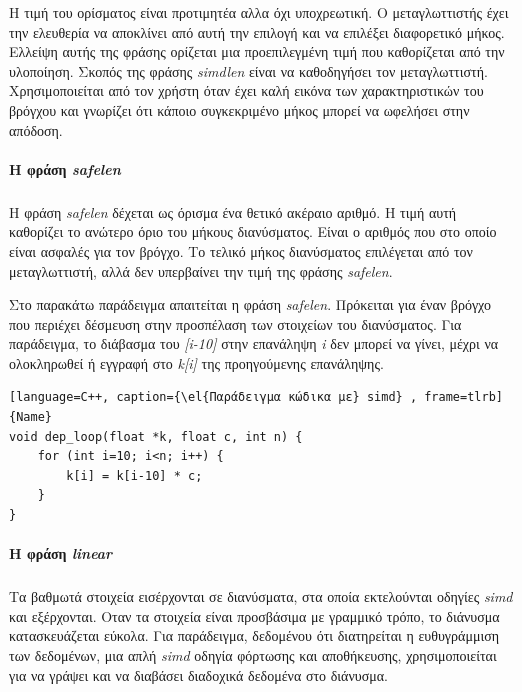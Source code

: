 \documentclass[12pt]{article}
\newcommand{\en}[1]{\foreignlanguage{english}{#1}}
\newcommand{\el}[1]{\selectlanguage{greek}{#1}\selectlanguage{english}}
\begin{document}
Η τιμή του ορίσματος είναι προτιμητέα αλλα όχι υποχρεωτική. Ο μεταγλωττιστής έχει την ελευθερία να αποκλίνει από αυτή την επιλογή και να επιλέξει διαφορετικό μήκος. Ελλείψη αυτής της φράσης ορίζεται μια προεπιλεγμένη τιμή που καθορίζεται από την υλοποίηση. Σκοπός της φράσης \emph{\en{simdlen}} είναι να καθοδηγήσει τον μεταγλωττιστή. Χρησιμοποιείται από τον χρήστη όταν έχει καλή εικόνα των χαρακτηριστικών του βρόγχου και γνωρίζει ότι κάποιο συγκεκριμένο μήκος μπορεί να ωφελήσει στην απόδοση.
\ \\

\paragraph{H φράση \emph{\en{safelen}}}
\subparagraph{}
Η φράση \emph{\en{safelen}} δέχεται ως όρισμα ένα θετικό ακέραιο αριθμό. Η τιμή αυτή καθορίζει το ανώτερο όριο του μήκους διανύσματος. Είναι ο αριθμός που στο οποίο είναι ασφαλές για τον βρόγχο. Το τελικό μήκος διανύσματος επιλέγεται από τον μεταγλωττιστή, αλλά δεν υπερβαίνει την τιμή της φράσης 
\emph{\en{safelen}}.

Στο παρακάτω παράδειγμα απαιτείται η φράση \emph{\en{safelen}}. Πρόκειται για έναν βρόγχο που περιέχει
 δέσμευση στην προσπέλαση των στοιχείων του διανύσματος.
 Για παράδειγμα, το διάβασμα του \emph{\en{[i-10]}} στην επανάληψη \emph{\en{i}} δεν μπορεί να γίνει, μέχρι να ολοκληρωθεί ή εγγραφή στο \emph{\en{k[i]}} της προηγούμενης επανάληψης.
 
 \clearpage

\begin{lstlisting}[language=C++, caption={\el{Παράδειγμα κώδικα με} simd} , frame=tlrb]{Name}
void dep_loop(float *k, float c, int n) {
	for (int i=10; i<n; i++) {
		k[i] = k[i-10] * c;
	}
}
\end{lstlisting}

\paragraph{H φράση \emph{\en{linear}}}
\subparagraph{}
Τα βαθμωτά στοιχεία εισέρχονται σε διανύσματα, στα οποία εκτελούνται οδηγίες \emph{\en{simd}} και εξέρχονται. Οταν τα στοιχεία είναι προσβάσιμα με γραμμικό τρόπο, το διάνυσμα κατασκευάζεται εύκολα. Για παράδειγμα, δεδομένου ότι διατηρείται η ευθυγράμμιση των δεδομένων, μια απλή \emph{\en{simd}} οδηγία φόρτωσης και αποθήκευσης, χρησιμοποιείται για να γράψει και να διαβάσει διαδοχικά δεδομένα στο διάνυσμα.
\end{document}
